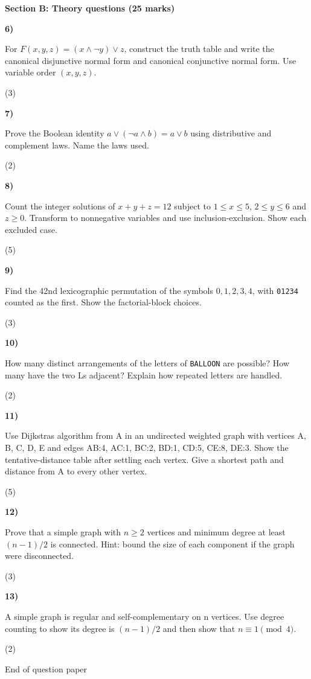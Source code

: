\documentclass[11pt,a4paper]{article}
\newcommand{\question}[3]{\par\vspace{8pt}\noindent\begin{minipage}[t]{0.075\linewidth}\textbf{#1)}\end{minipage}\begin{minipage}[t]{0.855\linewidth}#3\end{minipage}\hfill\begin{minipage}[t]{0.055\linewidth}\raggedleft(#2)\end{minipage}\par}
\begin{document}
\newpage\textbf{Section B: Theory questions (25 marks)}\par
\question{6}{3}{For $F(x,y,z)=(x\land\neg y)\lor z$, construct the truth table and write the canonical disjunctive normal form and canonical conjunctive normal form. Use variable order $(x,y,z)$.}
\question{7}{2}{Prove the Boolean identity $a\lor(\neg a\land b)=a\lor b$ using distributive and complement laws. Name the laws used.}
\question{8}{5}{Count the integer solutions of $x+y+z=12$ subject to $1\le x\le5$, $2\le y\le6$ and $z\ge0$. Transform to nonnegative variables and use inclusion-exclusion. Show each excluded case.}
\question{9}{3}{Find the 42nd lexicographic permutation of the symbols $0,1,2,3,4$, with \texttt{01234} counted as the first. Show the factorial-block choices.}
\question{10}{2}{How many distinct arrangements of the letters of \texttt{BALLOON} are possible? How many have the two Ls adjacent? Explain how repeated letters are handled.}
\question{11}{5}{Use Dijkstra\textquotesingle s algorithm from A in an undirected weighted graph with vertices A, B, C, D, E and edges AB:4, AC:1, BC:2, BD:1, CD:5, CE:8, DE:3. Show the tentative-distance table after settling each vertex. Give a shortest path and distance from A to every other vertex.}
\question{12}{3}{Prove that a simple graph with $n\ge2$ vertices and minimum degree at least $(n-1)/2$ is connected. Hint: bound the size of each component if the graph were disconnected.}
\question{13}{2}{A simple graph is regular and self-complementary on n vertices. Use degree counting to show its degree is $(n-1)/2$ and then show that $n\equiv1\pmod4$.}
\vfill\begin{center}\small End of question paper\end{center}
\end{document}

